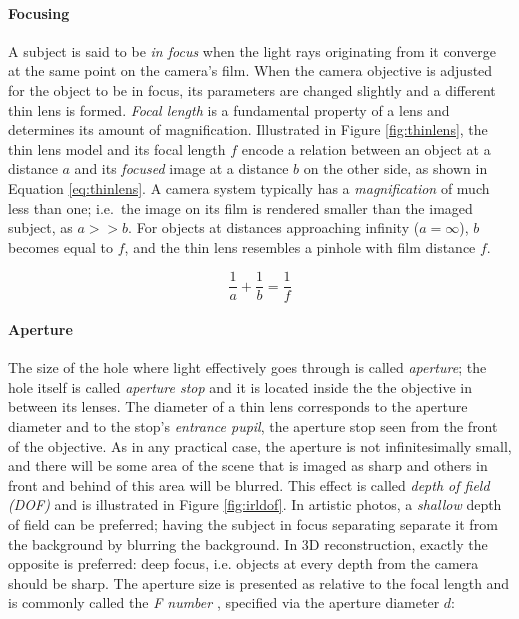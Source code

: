 \paragraph{Focusing}
A subject is said to be \emph{in focus} when the light rays originating from it converge at the same point on the camera's film.
When the camera objective is adjusted for the object to be in focus, its parameters are changed slightly and a different thin lens is formed.
\emph{Focal length} is a fundamental property of a lens and determines its amount of magnification.
\cite{szeliski10vision,greenleaf1950photographic}
Illustrated in Figure \ref{fig:thinlens}, the thin lens model and its focal length $f$ encode a relation between an object at a distance $a$ and its \emph{focused} image at a distance $b$ on the other side, as shown in Equation \ref{eq:thinlens}.
A camera system typically has a \emph{magnification} of much less than one; i.e.\ the image on its film is rendered smaller than the imaged subject, as $a >> b$.
For objects at distances approaching infinity ($a = \infty$), $b$ becomes equal to $f$, and the thin lens resembles a pinhole with film distance $f$.

\begin{equation} \label{eq:thinlens}
	\frac{1}{a} + \frac{1}{b} = \frac{1}{f}
\end{equation}





\paragraph{Aperture}
The size of the hole where light effectively goes through is called \emph{aperture}; the hole itself is called \emph{aperture stop} and it is located inside the the objective in between its lenses.
The diameter of a thin lens corresponds to the aperture diameter and to the stop's \emph{entrance pupil}, the aperture stop seen from the front of the objective.
\cite{greenleaf1950photographic}
As in any practical case, the aperture is not infinitesimally small, and there will be some area of the scene that is imaged as sharp and others in front and behind of this area will be blurred.
This effect is called \emph{depth of field (DOF)} and is illustrated in Figure \ref{fig:irldof}.
In artistic photos, a \emph{shallow} depth of field can be preferred; having the subject in focus separating separate it from the background by blurring the background.
In 3D reconstruction, exactly the opposite is preferred: deep focus, i.e. objects at every depth from the camera should be sharp.
The aperture size is presented as relative to the focal length and is commonly called the \emph{F number} \cite{szeliski10vision,greenleaf1950photographic}, specified via the aperture diameter $d$:

